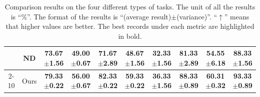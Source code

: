\begin{table}
\begin{tabular}{c|c|cccccc|cc}
& ND     & 73.67{\tiny $\pm$1.56}          & 49.00{\tiny $\pm$0.67}          & 71.67{\tiny $\pm$2.89}          & 48.67{\tiny $\pm$1.56}          & 32.33{\tiny $\pm$1.56}          & 81.33{\tiny $\pm$2.89}          & 54.55{\tiny $\pm$6.18}          & 88.33{\tiny $\pm$1.56}          \\  \cmidrule{2-10}
& Ours   & \textbf{79.33{\tiny $\pm$0.22}} & \textbf{56.00{\tiny $\pm$0.67}} & \textbf{82.33{\tiny $\pm$0.22}} & \textbf{59.33{\tiny $\pm$0.22}} & \textbf{36.33{\tiny $\pm$1.56}} & \textbf{88.33{\tiny $\pm$0.89}} & \textbf{60.31{\tiny $\pm$0.32}} & \textbf{93.33{\tiny $\pm$0.89}} \\ \bottomrule
\end{tabular}
  \caption{\label{main_result_acc}
   Comparison results on the four different types of tasks. The unit of all the results is ``$\%$''. The format of the results is ``(average result)$\pm$(variance)''. ``$\uparrow$'' means that higher values are better. The best records under each metric are highlighted in bold.
  }
\end{table}